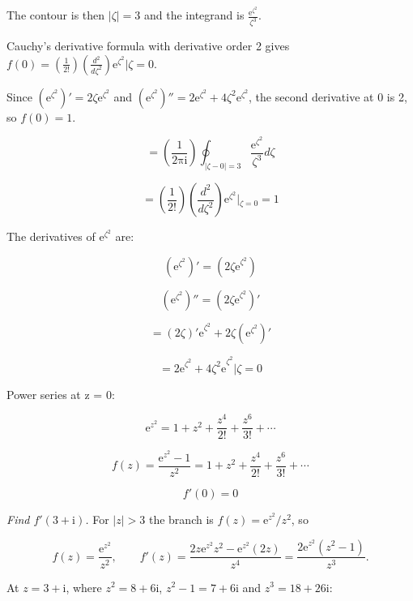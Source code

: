 \documentclass[11pt,a4paper]{article}
\theoremstyle{definition}
\theoremstyle{plain}
\begin{document}
The contour is then $\vert{}\zeta\vert{} = 3$ and the integrand is $\frac{\mathrm{e}^{\zeta^{2}}}{\zeta^{3}}$.

Cauchy’s derivative formula with derivative order 2 gives $f(0) = \left(\frac{1}{2!}\right)\left(\frac{d^{2}}{d\zeta^{2}}\right)\mathrm{e}^{\zeta^{2}}\vert{}\zeta = 0$.

Since $(\mathrm{e}^{\zeta^{2}})'= 2\zeta \mathrm{e}^{\zeta^{2}}$ and $(\mathrm{e}^{\zeta^{2}})''= 2\mathrm{e}^{\zeta^{2}} + 4\zeta^{2}\mathrm{e}^{\zeta^{2}}$, the second derivative at 0 is 2, so $f(0) = 1$.

\[
= \left(\frac{1}{2\mathrm{\pi}\mathrm{i}}\right)\oint_{\vert{}\zeta - 0\vert{} = 3}\frac{\mathrm{e}^{\zeta^{2}}}{\zeta^{3}}d\zeta
\]

\[
= \left(\frac{1}{2!}\right)\left(\frac{d^{2}}{d\zeta^{2}}\right)\mathrm{e}^{\zeta^{2}}\vert{}_{\zeta = 0} = 1
\]

The derivatives of $\mathrm{e}^{\zeta^{2}}$ are:

\begin{equation}
(\mathrm{e}^{\zeta^{2}})'= ({2\zeta \mathrm{e}}^{\zeta^{2}})
\end{equation}

\[
(\mathrm{e}^{\zeta^{2}})''= ({2\zeta \mathrm{e}}^{\zeta^{2}})'
\]

\[
= (2\zeta){'\mathrm{e}}^{\zeta^{2}} + 2\zeta(\mathrm{e}^{\zeta^{2}})'
\]

\[
= {2\mathrm{e}}^{\zeta^{2}} + {4\zeta^{2}\mathrm{e}}^{\zeta^{2}} \vert{}\zeta = 0
\]

Power series at z = 0:

\begin{equation}
\mathrm{e}^{z^{2}} = 1 + z^{2} + \frac{z^{4}}{2!} + \frac{z^{6}}{3!} + \cdots
\end{equation}

\[
f(z) = \frac{\mathrm{e}^{z^{2}} - 1}{z^{2}} = 1 + z^{2} + \frac{z^{4}}{2!} + \frac{z^{6}}{3!} + \cdots
\]

\[
f'(0) = 0
\]

\textit{Find $f'(3 + \mathrm{i})$.} For $\vert{}z\vert{} > 3$ the branch is $f(z) = \mathrm{e}^{z^{2}}/z^{2}$, so

\[
f(z) = \frac{\mathrm{e}^{z^{2}}}{z^{2}}, \qquad
f'(z) = \frac{2z\mathrm{e}^{z^{2}}z^{2} - \mathrm{e}^{z^{2}}(2z)}{z^{4}}
= \frac{2\mathrm{e}^{z^{2}}(z^{2} - 1)}{z^{3}} .
\]

At $z = 3 + \mathrm{i}$, where $z^{2} = 8 + 6\mathrm{i}$, $z^{2} - 1 = 7 + 6\mathrm{i}$ and $z^{3} = 18 + 26\mathrm{i}$:
\end{document}
